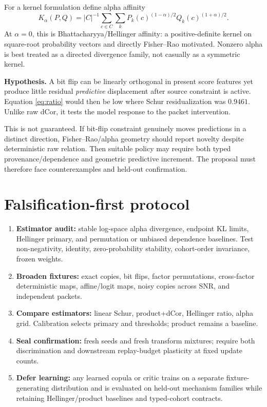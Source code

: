 \documentclass[11pt]{article}
\newcommand{\hypo}{\textbf{Hypothesis.} }
\begin{document}
For a kernel formulation define alpha affinity
\begin{equation}
K_\alpha(P,Q)=|C|^{-1}\sum_{c\in C}\sum_k
P_k(c)^{(1-\alpha)/2}Q_k(c)^{(1+\alpha)/2}.
\end{equation}
At $\alpha=0$, this is Bhattacharyya/Hellinger affinity: a positive-definite kernel on square-root probability vectors and directly Fisher--Rao motivated. Nonzero alpha is best treated as a directed divergence family, not casually as a symmetric kernel.

\hypo A bit flip can be linearly orthogonal in present score features yet produce little residual \emph{predictive} displacement after source constraint is active. Equation \ref{eq:ratio} would then be low where Schur residualization was $0.9461$. Unlike raw dCor, it tests the model response to the packet intervention.

This is not guaranteed. If bit-flip constraint genuinely moves predictions in a distinct direction, Fisher--Rao/alpha geometry should report novelty despite deterministic raw relation. Then suitable policy may require both typed provenance/dependence and geometric predictive increment. The proposal must therefore face counterexamples and held-out confirmation.

\section{Falsification-first protocol}
\begin{enumerate}
\item \textbf{Estimator audit:} stable log-space alpha divergence, endpoint KL limits, Hellinger primary, and permutation or unbiased dependence baselines. Test non-negativity, identity, zero-probability stability, cohort-order invariance, frozen weights.
\item \textbf{Broaden fixtures:} exact copies, bit flips, factor permutations, cross-factor deterministic maps, affine/logit maps, noisy copies across SNR, and independent packets.
\item \textbf{Compare estimators:} linear Schur, product+dCor, Hellinger ratio, alpha grid. Calibration selects primary and thresholds; product remains a baseline.
\item \textbf{Seal confirmation:} fresh seeds and fresh transform mixtures; require both discrimination and downstream replay-budget plasticity at fixed update counts.
\item \textbf{Defer learning:} any learned copula or critic trains on a separate fixture-generating distribution and is evaluated on held-out mechanism families while retaining Hellinger/product baselines and typed-cohort contracts.
\end{enumerate}
\end{document}
